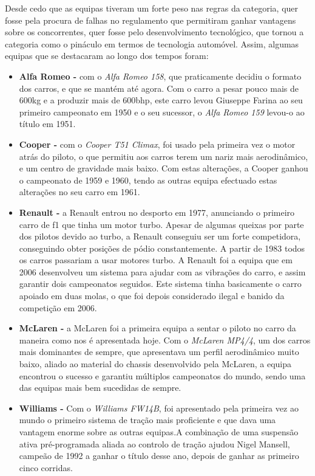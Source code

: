 \documentclass{report}
\begin{document}
\hspace{\parindent}Desde cedo que as equipas tiveram um forte peso nas regras da categoria, quer fosse pela procura de falhas no regulamento que permitiram ganhar vantagens sobre os concorrentes, quer fosse pelo desenvolvimento tecnológico, que tornou a categoria como o pináculo em termos de tecnologia automóvel. Assim, algumas equipas que se destacaram ao longo dos tempos foram:
\begin{itemize}
  \item \textbf{Alfa Romeo -} com o \textit{Alfa Romeo 158}, que praticamente decidiu o formato dos carros, e que se mantém até agora. Com o carro a pesar pouco mais de 600kg e a produzir mais de 600\ac{bhp}, este carro levou Giuseppe Farina ao seu primeiro campeonato em 1950 e o seu sucessor, o \textit{Alfa Romeo 159} levou-o ao título em 1951.
  \item \textbf{Cooper -} com o \textit{Cooper T51 Climax}, foi usado pela primeira vez o motor atrás do piloto, o que permitiu aos carros terem um nariz mais aerodinâmico, e um centro de gravidade mais baixo. Com estas alterações, a Cooper ganhou o campeonato de 1959 e 1960, tendo as outras equipa efectuado estas alterações no seu carro em 1961.
   \item \textbf {Renault -} a Renault entrou no desporto em 1977, anunciando o primeiro carro de \ac{f1} que tinha um motor turbo. Apesar de algumas queixas por parte dos pilotos devido ao turbo, a Renault conseguiu ser um forte competidora, conseguindo obter posições de pódio constantemente. A partir de 1983 todos os carros passariam a usar motores turbo. A Renault foi a equipa que em 2006 desenvolveu um sistema para ajudar com as vibrações do carro, e assim garantir dois campeonatos seguidos. Este sistema tinha basicamente o carro apoiado em duas molas, o que foi depois considerado ilegal e banido da competição em 2006.
   \item \textbf{McLaren -} a McLaren foi a primeira equipa a sentar o piloto no carro da maneira como nos é apresentada hoje. Com o \textit{McLaren MP4/4}, um dos carros mais dominantes de sempre, que apresentava um perfil aerodinâmico muito baixo, aliado ao material do chassis desenvolvido pela McLaren, a equipa encontrou o sucesso e garantiu múltiplos campeonatos do mundo, sendo uma das equipas mais bem sucedidas de sempre.
    \item \textbf{Williams -} Com o \textit{Williams FW14B}, foi apresentado pela primeira vez ao mundo o primeiro sistema de tração mais proficiente e que dava uma vantagem enorme sobre as outras equipas.A combinação de uma suspensão ativa pré-programada aliada ao controlo de tração ajudou Nigel Mansell, campeão de 1992 a ganhar o título desse ano, depois de ganhar as primeiro cinco corridas.

\end{itemize}
\end{document}
